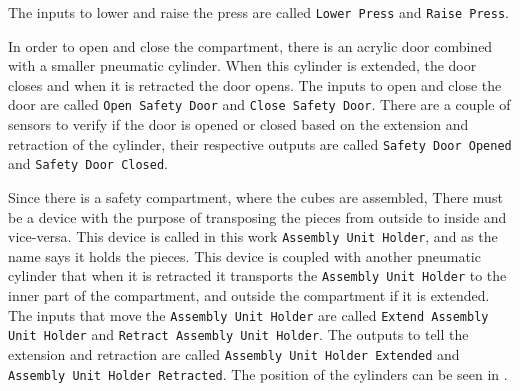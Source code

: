 The inputs to lower and raise the press are called \verb|Lower Press| and
\verb|Raise Press|.

In order to open and close the compartment, there is an acrylic door combined
with a smaller pneumatic cylinder. When this cylinder is extended, the door
closes and when it is retracted the door opens. The inputs to open and close the
door are called \verb|Open Safety Door| and
\verb|Close Safety Door|. There are a couple of sensors to verify if the door is
opened or closed based on the extension and retraction of the cylinder, their
respective outputs are called \verb|Safety Door Opened| and
\verb|Safety Door Closed|.

Since there is a safety compartment, where the cubes are assembled, There must
be a device with the purpose of transposing the pieces from outside to inside
and vice-versa. This device is called in this work
\verb|Assembly Unit Holder|, and as the name says it holds the pieces. This
device is coupled with another pneumatic cylinder that when it is retracted
it transports the \verb|Assembly Unit Holder| to the inner part of the
compartment, and outside the compartment if it is extended. The inputs that move
the \verb|Assembly Unit Holder| are called
\verb|Extend Assembly Unit Holder| and
\verb|Retract Assembly Unit Holder|. The outputs to tell the extension and
retraction are called \verb|Assembly Unit Holder Extended|
and \verb|Assembly Unit Holder Retracted|. The position of the cylinders can be
seen in .
